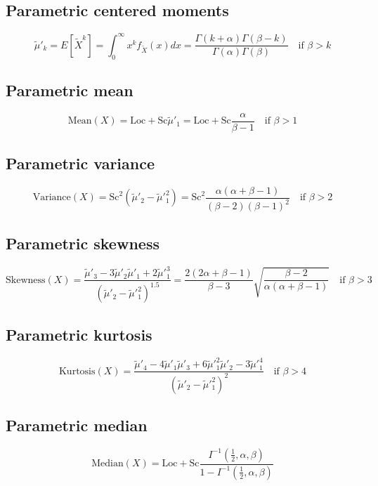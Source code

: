 \documentclass{article}
\begin{document}
\subsection{Parametric centered moments}
\begin{equation*} \tilde{\mu}'_{k}=E[\tilde{X}^k]=\int_{0}^{\infty}x^{k}f_{\tilde{X}}\left(x\right)dx=\frac{\Gamma\left(k+\alpha\right)\Gamma\left(\beta-k\right)}{\Gamma\left(\alpha\right)\Gamma\left(\beta\right)} \quad \text{if }\beta>k \end{equation*}
\subsection{Parametric mean}
\begin{equation*} \mathrm{Mean}(X)=\text{Loc}+\text{Sc}\tilde{\mu}'_{1}=\text{Loc}+\text{Sc}\frac{\alpha}{\beta-1} \quad \text{if }\beta>1 \end{equation*}
\subsection{Parametric variance}
\begin{equation*} \mathrm{Variance}(X)=\text{Sc}^{2}(\tilde{\mu}'_{2}-\tilde{\mu}'^{2}_{1})=\text{Sc}^{2}\frac{\alpha(\alpha+\beta-1)}{(\beta-2)(\beta-1)^2} \quad \text{if }\beta>2 \end{equation*}
\subsection{Parametric skewness}
\begin{equation*} \mathrm{Skewness}(X)=\frac{\tilde{\mu}'_{3}-3\tilde{\mu}'_{2}\tilde{\mu}'_{1}+2\tilde{\mu}'^{3}_{1}}{(\tilde{\mu}'_{2}-\tilde{\mu}'^{2}_{1})^{1.5}}=\frac{2(2\alpha+\beta-1)}{\beta-3}\sqrt{\frac{\beta-2}{\alpha(\alpha+\beta-1)}} \quad \text{if }\beta>3 \end{equation*}
\subsection{Parametric kurtosis}
\begin{equation*} \mathrm{Kurtosis}(X)=\frac{\tilde{\mu}'_{4}-4\tilde{\mu}'_{1}\tilde{\mu}'_{3}+6\tilde{\mu}'^{2}_{1}\tilde{\mu}'_{2}-3\tilde{\mu}'^{4}_{1}}{(\tilde{\mu}'_{2}-\tilde{\mu}'^{2}_{1})^{2}} \quad \text{if }\beta>4 \end{equation*}
\subsection{Parametric median}
\begin{equation*} \mathrm{Median}(X)=\text{Loc}+\text{Sc}\frac{I^{-1}\left(\frac{1}{2},\alpha,\beta\right)}{1-I^{-1}\left(\frac{1}{2},\alpha,\beta\right)} \end{equation*}
\end{document}

